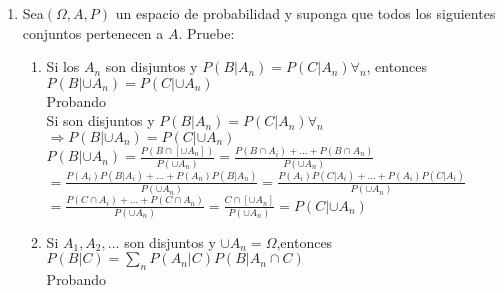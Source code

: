 \documentclass[12pt]{article}
\begin{document}
\begin{enumerate}
\begin{enumerate}[a)]
\begin{enumerate}[i)]
\item Si k es impar, k$\leqslant n$, entonces \\
 $P(\displaystyle\bigcup_{i=1}^{n}A_i)\leqslant \displaystyle\sum_{i=1}^{n}P(A_i)-\displaystyle\sum_{1\leqslant {i_1}<{i_2}\leqslant n}P(A_{i_1}\cap A_{i_2})+ (-1)^{k-1}\displaystyle\sum_{1\leqslant i_1 <...<i_k\leqslant n}P(A_i\cap ...\cap A_{i_k})$\\
 si k es par $k\leqslant n $, vale$ \geqslant$ en esta ultima desigualdad \\
$P(\displaystyle\bigcup_{i=1}^{n}A_i)= \displaystyle\sum_{i=1}^{n}P(A_i)-\displaystyle\sum_{1\leqslant {i_1}<{i_2}\leqslant n}P(A_{i_1}\cap A_{i_2})+ (-1)^{k-1}\displaystyle\sum_{1\leqslant i_1 <...<i_k\leqslant n}P(A_i\cap ...\cap A_{i_k})+(-1)^k\displaystyle \sum_{i\leqslant i_1<...<i_k<i_{k+1}}P(\cup(A_{i1}\cap ...\cap A_{ik}\cap A_{ik+1}))$\\
Si k es par tenemos que la ultima parte de esta sumatoria es positivo y esta ocurre $\leqslant$ cuando retiramos esta ultima parte . Si k es impar tenemos negativo o desigualdades.
\end{enumerate}
\end{enumerate}
\item Sea$(\Omega , A,P)$ un espacio de probabilidad y suponga que todos los siguientes conjuntos pertenecen a $A$. Pruebe:\\
\begin{enumerate}
\item Si los $A_n$ son disjuntos y $P(B|A_n)=P(C|A_n)\forall_n$, entonces \\
$P(B|\cup A_n)=P(C|\cup A_n)$\\
Probando\\
Si son disjuntos y $P(B|A_n)=P(C|A_n)\forall_n$\\
$\Rightarrow P(B|\cup A_n)=P(C|\cup A_n)$\\
 $P(B|\cup A_n)= \frac{P(B\cap [\cup A_n])}{P(\cup A_n)}=\frac{P(B\cap A_i)+...+P(B\cap A_n)}{P(\cup A_n)}$\\
$=\frac{P(A_i)P(B|A_i)+...+P(A_n)P(B|A_n)}{P(\cup A_n)}=\frac{P(A_i)P(C|A_i)+...+P(A_i)P(C|A_i)}{P(\cup A_n)}$\\
$=\frac{P(C\cap A_i)+...+P(C\cap A_n)}{P(\cup A_n)}=\frac{C\cap [\cup A_n]}{P(\cup A_n)}=P(C|\cup A_n)$
\item Si $A_1,A_2,...$ son disjuntos y $\cup A_n=\Omega$,entonces\\
$P(B|C)=\displaystyle \sum_n P(A_n|C)P(B|A_n\cap C)$\\
Probando\\

\end{enumerate}
\end{enumerate}
\end{document}
